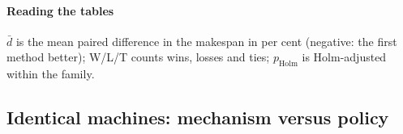 \paragraph{Reading the tables}
$\bar d$ is the mean paired difference in the makespan in per cent (negative: the first method better); W/L/T counts wins, losses and ties; $p_{\mathrm{Holm}}$ is Holm-adjusted within the family.

\subsection{Identical machines: mechanism versus policy}
\label{sec:f3f4-ablation}
